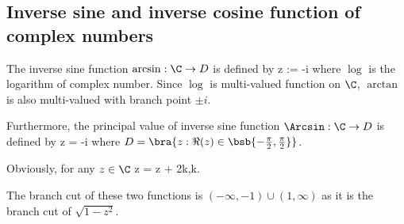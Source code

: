 \subsection{Inverse sine and inverse cosine function of complex numbers}

\begin{definition}
The inverse sine function $\arcsin:\C \to D$ is defined by
\be
\arcsin z :=  -i\log{}
\ee
where $\log$ is the logarithm of complex number. Since $\log$ is multi-valued function on $\C$, $\arctan$ is also multi-valued with branch point $\pm i$.

Furthermore, the principal value of inverse sine function $\Arcsin:\C \to D$ is defined by
\be
\Arcsin z =  -i\Log{}
\ee
where $D = \bra{z: \Re(z) \in \bsb{-\frac{\pi}2,\frac{\pi}2}}$.



Obviously, for any $z\in \C$
\be
\arcsin z = \Arcsin z + 2k\pi ,\qquad  k\in \Z.
\ee

The branch cut of these two functions is $(-\infty,-1)\cup (1,\infty)$ as it is the branch cut of $\sqrt{1-z^2}$.
\end{definition}

